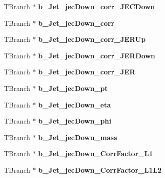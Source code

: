 \begin{DoxyCompactItemize}
\item 
\hypertarget{classMiniTree_a2da456dec4dd1d3459f47e09f9092599}{}\label{classMiniTree_a2da456dec4dd1d3459f47e09f9092599} 
T\+Branch $\ast$ {\bfseries b\+\_\+\+Jet\+\_\+jec\+Down\+\_\+corr\+\_\+\+J\+E\+C\+Down}
\item 
\hypertarget{classMiniTree_a9b54428e29953f7a8735ae9401dbf600}{}\label{classMiniTree_a9b54428e29953f7a8735ae9401dbf600} 
T\+Branch $\ast$ {\bfseries b\+\_\+\+Jet\+\_\+jec\+Down\+\_\+corr}
\item 
\hypertarget{classMiniTree_a9e0c7c91ce1470fd622e7fd4d89f9518}{}\label{classMiniTree_a9e0c7c91ce1470fd622e7fd4d89f9518} 
T\+Branch $\ast$ {\bfseries b\+\_\+\+Jet\+\_\+jec\+Down\+\_\+corr\+\_\+\+J\+E\+R\+Up}
\item 
\hypertarget{classMiniTree_a78e166fcefcd5f7a6e8f679da4bbca51}{}\label{classMiniTree_a78e166fcefcd5f7a6e8f679da4bbca51} 
T\+Branch $\ast$ {\bfseries b\+\_\+\+Jet\+\_\+jec\+Down\+\_\+corr\+\_\+\+J\+E\+R\+Down}
\item 
\hypertarget{classMiniTree_aef9c3aac3a08a4f27dc878a049abc44c}{}\label{classMiniTree_aef9c3aac3a08a4f27dc878a049abc44c} 
T\+Branch $\ast$ {\bfseries b\+\_\+\+Jet\+\_\+jec\+Down\+\_\+corr\+\_\+\+J\+ER}
\item 
\hypertarget{classMiniTree_ab7b36bf2371253cb22508b2da564ce06}{}\label{classMiniTree_ab7b36bf2371253cb22508b2da564ce06} 
T\+Branch $\ast$ {\bfseries b\+\_\+\+Jet\+\_\+jec\+Down\+\_\+pt}
\item 
\hypertarget{classMiniTree_a06d39c4af16224625ae2ab9cf5f6e868}{}\label{classMiniTree_a06d39c4af16224625ae2ab9cf5f6e868} 
T\+Branch $\ast$ {\bfseries b\+\_\+\+Jet\+\_\+jec\+Down\+\_\+eta}
\item 
\hypertarget{classMiniTree_af9d60b70a02cbb8e9e9532a388bc8ca9}{}\label{classMiniTree_af9d60b70a02cbb8e9e9532a388bc8ca9} 
T\+Branch $\ast$ {\bfseries b\+\_\+\+Jet\+\_\+jec\+Down\+\_\+phi}
\item 
\hypertarget{classMiniTree_a7182034ad0457676a67d87e4e5c81112}{}\label{classMiniTree_a7182034ad0457676a67d87e4e5c81112} 
T\+Branch $\ast$ {\bfseries b\+\_\+\+Jet\+\_\+jec\+Down\+\_\+mass}
\item 
\hypertarget{classMiniTree_a7a8c1d901c5d7338b396eb2a1c92e83b}{}\label{classMiniTree_a7a8c1d901c5d7338b396eb2a1c92e83b} 
T\+Branch $\ast$ {\bfseries b\+\_\+\+Jet\+\_\+jec\+Down\+\_\+\+Corr\+Factor\+\_\+\+L1}
\item 
\hypertarget{classMiniTree_a1fe671be2aac69dec5e4f09f599eee33}{}\label{classMiniTree_a1fe671be2aac69dec5e4f09f599eee33} 
T\+Branch $\ast$ {\bfseries b\+\_\+\+Jet\+\_\+jec\+Down\+\_\+\+Corr\+Factor\+\_\+\+L1\+L2}

\end{DoxyCompactItemize}
